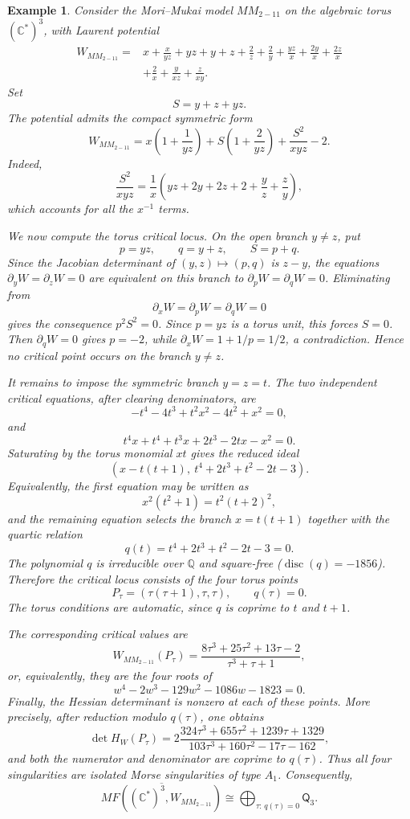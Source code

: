 \documentclass[11pt]{amsart}
\newtheorem{example}{Example}[section]
\newcommand{\MorseCat}[1]{\mathsf{Q}_{#1}}
\begin{document}
\begin{example}
Consider the Mori--Mukai model $MM_{2-11}$ on the algebraic torus
$(\mathbb{C}^*)^3$, with Laurent potential
\begin{align*}
W_{MM_{2-11}}={}&x+\frac{x}{yz}+yz+y+z+\frac{2}{z}+\frac{2}{y}
+\frac{yz}{x}+\frac{2y}{x}+\frac{2z}{x} \\
&+\frac{2}{x}+\frac{y}{xz}+\frac{z}{xy}.
\end{align*}
Set
\[
S=y+z+yz.
\]
The potential admits the compact symmetric form
\[
W_{MM_{2-11}}
=x\left(1+\frac{1}{yz}\right)
+S\left(1+\frac{2}{yz}\right)
+\frac{S^2}{xyz}-2.
\]
Indeed,
\[
\frac{S^2}{xyz}
=\frac{1}{x}\left(yz+2y+2z+2+\frac{y}{z}+\frac{z}{y}\right),
\]
which accounts for all the $x^{-1}$ terms.

We now compute the torus critical locus. On the open branch $y\neq z$, put
\[
p=yz,
\qquad
q=y+z,
\qquad
S=p+q.
\]
Since the Jacobian determinant of $(y,z)\mapsto(p,q)$ is $z-y$, the equations
$\partial_yW=\partial_zW=0$ are equivalent on this branch to
$\partial_pW=\partial_qW=0$. Eliminating from
\[
\partial_xW=\partial_pW=\partial_qW=0
\]
gives the consequence $p^2S^2=0$. Since $p=yz$ is a torus unit, this forces
$S=0$. Then $\partial_qW=0$ gives $p=-2$, while
$\partial_xW=1+1/p=1/2$, a contradiction. Hence no critical point occurs on
the branch $y\neq z$.

It remains to impose the symmetric branch $y=z=t$. The two independent
critical equations, after clearing denominators, are
\[
-t^4-4t^3+t^2x^2-4t^2+x^2=0,
\]
and
\[
t^4x+t^4+t^3x+2t^3-2tx-x^2=0.
\]
Saturating by the torus monomial $xt$ gives the reduced ideal
\[
\left(x-t(t+1),\ t^4+2t^3+t^2-2t-3\right).
\]
Equivalently, the first equation may be written as
\[
x^2(t^2+1)=t^2(t+2)^2,
\]
and the remaining equation selects the branch $x=t(t+1)$ together with the
quartic relation
\[
q(t)=t^4+2t^3+t^2-2t-3=0.
\]
The polynomial $q$ is irreducible over $\mathbb{Q}$ and square-free
($\operatorname{disc}(q)=-1856$). Therefore the critical locus consists of the
four torus points
\[
P_{\tau}=\left(\tau(\tau+1),\tau,\tau\right),
\qquad
q(\tau)=0.
\]
The torus conditions are automatic, since $q$ is coprime to $t$ and $t+1$.

The corresponding critical values are
\[
W_{MM_{2-11}}(P_{\tau})
=\frac{8\tau^3+25\tau^2+13\tau-2}{\tau^3+\tau+1},
\]
or, equivalently, they are the four roots of
\[
w^4-2w^3-129w^2-1086w-1823=0.
\]
Finally, the Hessian determinant is nonzero at each of these points. More
precisely, after reduction modulo $q(\tau)$, one obtains
\[
\det H_W(P_{\tau})
=2\frac{324\tau^3+655\tau^2+1239\tau+1329}
{103\tau^3+160\tau^2-17\tau-162},
\]
and both the numerator and denominator are coprime to $q(\tau)$. Thus all four
singularities are isolated Morse singularities of type $A_1$. Consequently,
\[
\overline{MF((\mathbb{C}^*)^3,W_{MM_{2-11}})}
\cong \bigoplus_{\tau:\,q(\tau)=0}\MorseCat{3}.
\]
\end{example}
\end{document}
